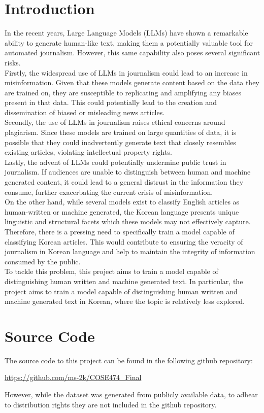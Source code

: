 \documentclass{article}
\begin{document}
\section{Introduction}
\quad In the recent years, Large Language Models (LLMs) have shown a remarkable ability to generate human-like text, making them a potentially valuable tool for automated journalism.
However, this same capability also poses several significant risks. \\
\null\quad Firstly, the widespread use of LLMs in journalism could lead to an increase in misinformation.
Given that these models generate content based on the data they are trained on,
they are susceptible to replicating and amplifying any biases present in that data.
This could potentially lead to the creation and dissemination of biased or misleading news articles. \\
\null\quad Secondly, the use of LLMs in journalism raises ethical concerns around plagiarism.
Since these models are trained on large quantities of data,
it is possible that they could inadvertently generate text that closely resembles existing articles,
violating intellectual property rights. \\
\null\quad Lastly, the advent of LLMs could potentially undermine public trust in journalism.
If audiences are unable to distinguish between human and machine generated content,
it could lead to a general distrust in the information they consume,
further exacerbating the current crisis of misinformation. \\
\null\quad On the other hand, while several models exist to classify English articles as human-written or machine generated,
the Korean language presents unique linguistic and structural facets which these models may not effectively capture.
Therefore, there is a pressing need to specifically train a model capable of classifying Korean articles.
This would contribute to ensuring the veracity of journalism in Korean language and help to maintain the integrity of information consumed by the public. \\
\null\quad To tackle this problem, this project aims to train a model capable of distinguishing human written and machine generated text.
In particular, the project aims to train a model capable of distinguishing human written and machine generated text in Korean, where the topic is relatively less explored. \\

\section{Source Code}
\null\quad The source code to this project can be found in the following github repository:
\begin{center} \url{https://github.com/ms-2k/COSE474_Final} \end{center}
\null\quad However, while the dataset was generated from publicly available data, to adhear to distribution rights they are not included in the github repository.
\end{document}
